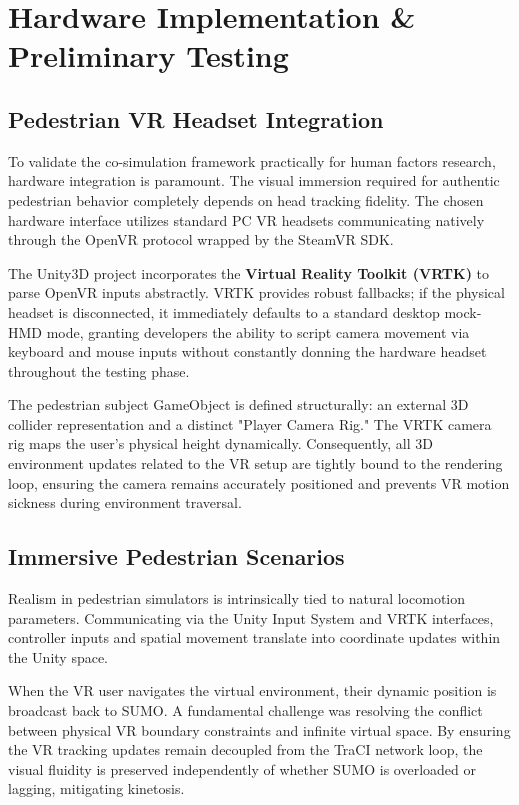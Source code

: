 \chapter{Hardware Implementation \& Preliminary Testing}

\section{Pedestrian VR Headset Integration}

To validate the co-simulation framework practically for human factors research, hardware integration is paramount. The visual immersion required for authentic pedestrian behavior completely depends on head tracking fidelity. The chosen hardware interface utilizes standard PC VR headsets communicating natively through the OpenVR protocol wrapped by the SteamVR SDK.

The Unity3D project incorporates the \textbf{Virtual Reality Toolkit (VRTK)} to parse OpenVR inputs abstractly. VRTK provides robust fallbacks; if the physical headset is disconnected, it immediately defaults to a standard desktop mock-HMD mode, granting developers the ability to script camera movement via keyboard and mouse inputs without constantly donning the hardware headset throughout the testing phase.

The pedestrian subject GameObject is defined structurally: an external 3D collider representation and a distinct "Player Camera Rig." The VRTK camera rig maps the user's physical height dynamically. Consequently, all 3D environment updates related to the VR setup are tightly bound to the rendering loop, ensuring the camera remains accurately positioned and prevents VR motion sickness during environment traversal.

\section{Immersive Pedestrian Scenarios}

Realism in pedestrian simulators is intrinsically tied to natural locomotion parameters. Communicating via the Unity Input System and VRTK interfaces, controller inputs and spatial movement translate into coordinate updates within the Unity space.

When the VR user navigates the virtual environment, their dynamic position is broadcast back to SUMO. A fundamental challenge was resolving the conflict between physical VR boundary constraints and infinite virtual space. By ensuring the VR tracking updates remain decoupled from the TraCI network loop, the visual fluidity is preserved independently of whether SUMO is overloaded or lagging, mitigating kinetosis.

